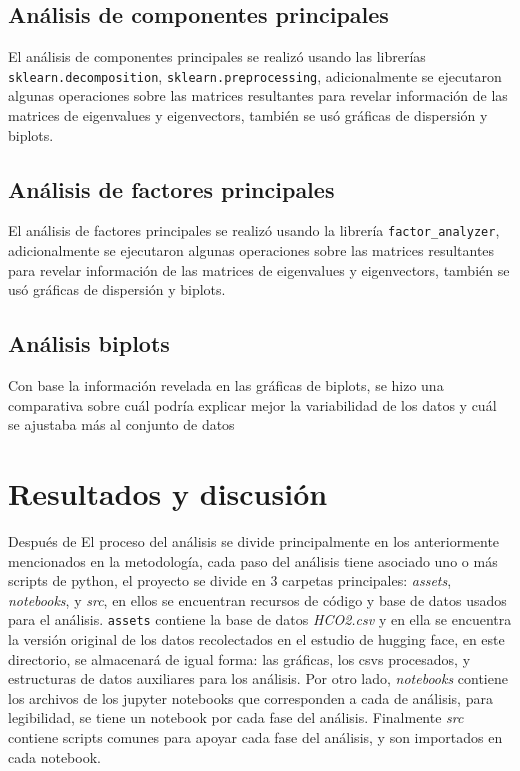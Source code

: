 \documentclass[journal]{IEEEtran}
\begin{document}
	\subsection{Análisis de componentes principales}
	\label{ssec:pca}
	El análisis de componentes principales se realizó usando las librerías \texttt{sklearn.decomposition}, \texttt{sklearn.preprocessing}, adicionalmente se ejecutaron algunas operaciones sobre las matrices resultantes para revelar información de las matrices de eigenvalues y eigenvectors, también se usó gráficas de dispersión y biplots. 
	
	\subsection{Análisis de factores principales}
	El análisis de factores principales se realizó usando la librería \texttt{factor\_analyzer}, adicionalmente se ejecutaron algunas operaciones sobre las matrices resultantes para revelar información de las matrices de eigenvalues y eigenvectors, también se usó gráficas de dispersión y biplots. 
	
	
	\subsection{Análisis biplots}
	Con base la información revelada en las gráficas de biplots, se hizo una comparativa sobre cuál podría explicar mejor la variabilidad de los datos y cuál se ajustaba más al conjunto de datos
	
	\section{Resultados y discusión}
	Después de
	\label{sec:data}
	El proceso del análisis se divide principalmente en los anteriormente mencionados en la metodología, cada paso del análisis tiene asociado uno o más scripts de python, el proyecto se divide en 3 carpetas principales: \textit{assets}, \textit{notebooks},  y \textit{src}, en ellos se encuentran recursos de código y base de datos usados para el análisis. \texttt{assets} contiene la base de datos \textit{HCO2.csv} y en ella se encuentra la versión original de los datos recolectados en el estudio de hugging face\cite{exploring_carbon_footprint}, en este directorio, se almacenará de igual forma: las gráficas, los csvs procesados, y estructuras de datos auxiliares para los análisis. Por otro lado, \textit{notebooks} contiene los archivos de los jupyter notebooks que corresponden a cada de análisis, para legibilidad, se tiene un notebook por cada fase del análisis. Finalmente  \textit{src} contiene scripts comunes para apoyar cada fase del análisis, y son importados en cada notebook.
\end{document}
